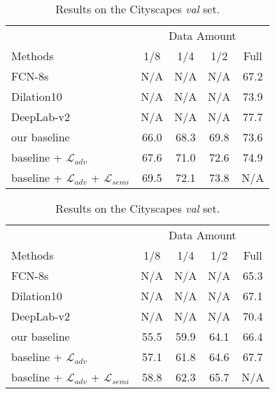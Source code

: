 \documentclass{bmvc2k}
\begin{document}
	\begin{table}
		\begin{minipage}[t]{.49\linewidth}
			\scriptsize
			\caption{Results on the VOC 2012 \emph{val} set.}
			\vspace{1mm}
			\label{table: pascal}
			\centering
			\begin{tabular}{lcccc}
				\toprule
				& \multicolumn{4}{c}{Data Amount} \\
				Methods & 1/8 & 1/4 & 1/2 & Full \\
				\midrule
				FCN-8s~\cite{fcn} &N/A &N/A &N/A & 67.2 \\
				Dilation10~\cite{dilated} &N/A &N/A &N/A & 73.9 \\
				DeepLab-v2~\cite{deeplab} &N/A &N/A &N/A & 77.7 \\
				\midrule
				our baseline     & 66.0 & 68.3 & 69.8 & 73.6 \\
				baseline + $\mathcal{L}_{adv}$ & 67.6 & 71.0 & 72.6 & 74.9\\
				baseline + $\mathcal{L}_{adv}$ + $\mathcal{L}_{semi}$ & 69.5 & 72.1 & 73.8 & N/A \\
				
				\bottomrule
			\end{tabular}
		\end{minipage}
		\hfill
		\begin{minipage}[t]{.49\linewidth}
			\scriptsize
			\caption{Results on the Cityscapes \emph{val} set.}
			
			\label{table: cityscapes}
			\centering
			\begin{tabular}{lcccc}
				\toprule
				
				& \multicolumn{4}{c}{Data Amount} \\
				Methods & 1/8 & 1/4 & 1/2 & Full \\
				\midrule
				FCN-8s~\citep{fcn} &N/A &N/A &N/A & 65.3 \\
				Dilation10~\citep{dilated} &N/A &N/A &N/A & 67.1 \\
				DeepLab-v2~\citep{deeplab} &N/A &N/A &N/A & 70.4 \\
				\midrule
				our baseline     & 55.5 & 59.9 & 64.1 & 66.4 \\
				
				baseline + $\mathcal{L}_{adv}$ & 57.1 & 61.8 & 64.6 & 67.7 \\
				baseline + $\mathcal{L}_{adv}$ + $\mathcal{L}_{semi}$ & 58.8 & 62.3 & 65.7 & N/A \\
				
				\bottomrule
			\end{tabular}
		\end{minipage}
		\vspace{-5mm}
	\end{table}
	
\end{document}
